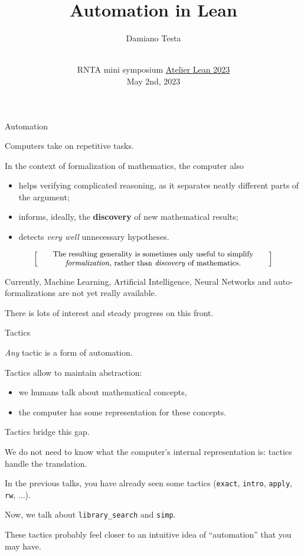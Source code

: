 \documentclass{beamer}
\title{Automation in Lean}
\author{Damiano Testa}
\institute[]{University of Warwick}
\date[\href{http://www.rnta.eu/7MSRNTA/lean.html}{Atelier Lean 2023}]{\\
\vspace{50pt}
RNTA mini symposium
\href{http://www.rnta.eu/7MSRNTA/lean.html}{Atelier Lean 2023}\\
\vspace{20pt}
May 2nd, 2023
}
\begin{document}
\frame{\titlepage}

\begin{frame}[fragile]
{Automation}

Computers take on repetitive tasks.

In the context of formalization of mathematics, the computer also

\vspace{-13pt}
\begin{itemize}
\setlength\itemsep{-12pt}
\item
  helps verifying complicated reasoning, as it separates neatly different parts of the argument;
\item
  informs, ideally, the {\textbf{discovery}} of new mathematical results;
\item
  detects {\emph{very well}} unnecessary hypotheses.
\end{itemize}

\[
  \left[ \;
  \parbox{0.8\textwidth}{\centering\small
  The resulting generality is sometimes only useful to simplify {\emph{formalization}}, rather than {\emph{discovery}} of mathematics.
  }
  \; \right]
\]

Currently, Machine Learning, Artificial Intelligence, Neural Networks and auto-formalizations are not yet really available.

There is lots of interest and steady progress on this front.
\end{frame}

\begin{frame}[fragile]{Tactics}

{\emph{Any}} tactic is a form of automation.

Tactics allow to maintain abstraction:

\vspace{-13pt}
\begin{itemize}
\setlength\itemsep{-12pt}
\item
  we humans talk about mathematical concepts,
\item
  the computer has some representation for these concepts.
\end{itemize}

Tactics bridge this gap.

We do not need to know what the computer's internal representation is: tactics handle the translation.
\end{frame}

\begin{frame}[fragile]

In the previous talks, you have already seen some tactics ({\color{violet}\verb`exact`}, {\color{violet}\verb`intro`}, {\color{violet}\verb`apply`}, {\color{violet}\verb`rw`}, ...).

Now, we talk about {\color{violet}\verb`library_search`} and {\color{violet}\verb`simp`}.

These tactics probably feel closer to an intuitive idea of ``automation'' that you may have.
\end{frame}
\end{document}
